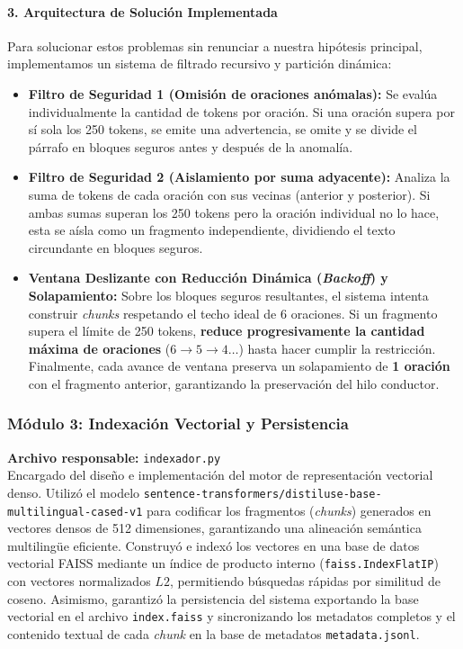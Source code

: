 \documentclass[12pt,a4paper]{article}
\begin{document}
\paragraph{3. Arquitectura de Solución Implementada}
Para solucionar estos problemas sin renunciar a nuestra hipótesis principal, implementamos un sistema de filtrado recursivo y partición dinámica:
\begin{itemize}
    \item \textbf{Filtro de Seguridad 1 (Omisión de oraciones anómalas):} Se evalúa individualmente la cantidad de tokens por oración. Si una oración supera por sí sola los 250 tokens, se emite una advertencia, se omite y se divide el párrafo en bloques seguros antes y después de la anomalía.
    \item \textbf{Filtro de Seguridad 2 (Aislamiento por suma adyacente):} Analiza la suma de tokens de cada oración con sus vecinas (anterior y posterior). Si ambas sumas superan los 250 tokens pero la oración individual no lo hace, esta se aísla como un fragmento independiente, dividiendo el texto circundante en bloques seguros.
    \item \textbf{Ventana Deslizante con Reducción Dinámica (\textit{Backoff}) y Solapamiento:} Sobre los bloques seguros resultantes, el sistema intenta construir \textit{chunks} respetando el techo ideal de 6 oraciones. Si un fragmento supera el límite de 250 tokens, \textbf{reduce progresivamente la cantidad máxima de oraciones} ($6 \rightarrow 5 \rightarrow 4 \dots$) hasta hacer cumplir la restricción. Finalmente, cada avance de ventana preserva un solapamiento de \textbf{1 oración} con el fragmento anterior, garantizando la preservación del hilo conductor.
\end{itemize}
\subsubsection{Módulo 3: Indexación Vectorial y Persistencia}
\textbf{Archivo responsable:} \texttt{indexador.py}\\
Encargado del diseño e implementación del motor de representación vectorial denso. Utilizó el modelo \texttt{sentence-transformers/distiluse-base-multilingual-cased-v1} para codificar los fragmentos (\textit{chunks}) generados en vectores densos de 512 dimensiones, garantizando una alineación semántica multilingüe eficiente. Construyó e indexó los vectores en una base de datos vectorial FAISS mediante un índice de producto interno (\texttt{faiss.IndexFlatIP}) con vectores normalizados $L2$, permitiendo búsquedas rápidas por similitud de coseno. Asimismo, garantizó la persistencia del sistema exportando la base vectorial en el archivo \texttt{index.faiss} y sincronizando los metadatos completos y el contenido textual de cada \textit{chunk} en la base de metadatos \texttt{metadata.jsonl}.
\end{document}
